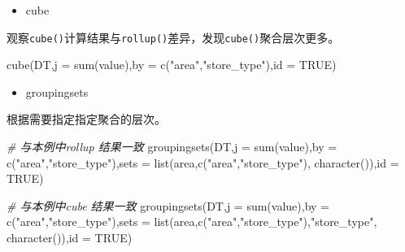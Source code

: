 \documentclass[
]{book}
\newenvironment{Shaded}{\begin{snugshade}}{\end{snugshade}}
\newcommand{\AttributeTok}[1]{\textcolor[rgb]{0.77,0.63,0.00}{#1}}
\newcommand{\CommentTok}[1]{\textcolor[rgb]{0.56,0.35,0.01}{\textit{#1}}}
\newcommand{\ConstantTok}[1]{\textcolor[rgb]{0.00,0.00,0.00}{#1}}
\newcommand{\FunctionTok}[1]{\textcolor[rgb]{0.00,0.00,0.00}{#1}}
\newcommand{\NormalTok}[1]{#1}
\newcommand{\StringTok}[1]{\textcolor[rgb]{0.31,0.60,0.02}{#1}}
\providecommand{\tightlist}{%
  \setlength{\itemsep}{0pt}\setlength{\parskip}{0pt}}
\begin{document}
\begin{itemize}
\tightlist
\item
  cube
\end{itemize}

观察\texttt{cube()}计算结果与\texttt{rollup()}差异，发现\texttt{cube()}聚合层次更多。

\begin{Shaded}
\begin{Highlighting}[]
\FunctionTok{cube}\NormalTok{(DT,}\AttributeTok{j =} \FunctionTok{sum}\NormalTok{(value),}\AttributeTok{by =} \FunctionTok{c}\NormalTok{(}\StringTok{"area"}\NormalTok{,}\StringTok{"store\_type"}\NormalTok{),}\AttributeTok{id =} \ConstantTok{TRUE}\NormalTok{)}
\end{Highlighting}
\end{Shaded}

\begin{itemize}
\tightlist
\item
  groupingsets
\end{itemize}

根据需要指定指定聚合的层次。

\begin{Shaded}
\begin{Highlighting}[]
\CommentTok{\# 与本例中rollup 结果一致}
\FunctionTok{groupingsets}\NormalTok{(DT,}\AttributeTok{j =} \FunctionTok{sum}\NormalTok{(value),}\AttributeTok{by =} \FunctionTok{c}\NormalTok{(}\StringTok{"area"}\NormalTok{,}\StringTok{"store\_type"}\NormalTok{),}\AttributeTok{sets =} \FunctionTok{list}\NormalTok{(}\StringTok{\textquotesingle{}area\textquotesingle{}}\NormalTok{,}\FunctionTok{c}\NormalTok{(}\StringTok{"area"}\NormalTok{,}\StringTok{"store\_type"}\NormalTok{), }\FunctionTok{character}\NormalTok{()),}\AttributeTok{id =} \ConstantTok{TRUE}\NormalTok{)}

\CommentTok{\# 与本例中cube 结果一致}
\FunctionTok{groupingsets}\NormalTok{(DT,}\AttributeTok{j =} \FunctionTok{sum}\NormalTok{(value),}\AttributeTok{by =} \FunctionTok{c}\NormalTok{(}\StringTok{"area"}\NormalTok{,}\StringTok{"store\_type"}\NormalTok{),}\AttributeTok{sets =} \FunctionTok{list}\NormalTok{(}\StringTok{\textquotesingle{}area\textquotesingle{}}\NormalTok{,}\FunctionTok{c}\NormalTok{(}\StringTok{"area"}\NormalTok{,}\StringTok{"store\_type"}\NormalTok{),}\StringTok{"store\_type"}\NormalTok{, }\FunctionTok{character}\NormalTok{()),}\AttributeTok{id =} \ConstantTok{TRUE}\NormalTok{)}
\end{Highlighting}
\end{Shaded}
\end{document}
